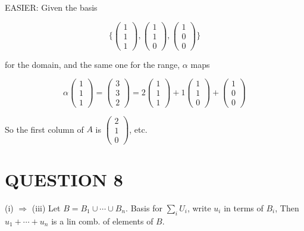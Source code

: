 \documentclass[a4paper]{article}
\begin{document}
EASIER:
Given the basis 

\[ \{  \begin{pmatrix}
1\\
1\\
1
\end{pmatrix},
\begin{pmatrix}
1\\
1\\
0
\end{pmatrix},
\begin{pmatrix}
1\\
0\\
0
\end{pmatrix} \} \]

for the domain, and the same one for the range, $ \alpha $ maps

\[ \alpha \begin{pmatrix}
1\\
1\\
1
\end{pmatrix} = \begin{pmatrix}
3\\
3\\
2
\end{pmatrix} = 2 \begin{pmatrix}
1\\
1\\
1
\end{pmatrix} 
+ 1 \begin{pmatrix}
1\\
1\\
0
\end{pmatrix}
+ 
\begin{pmatrix}
1\\
0\\
0
\end{pmatrix} \]

So the first column of $ A $ is $ \begin{pmatrix}
2\\
1\\
0
\end{pmatrix} $, etc. 



		
\section{QUESTION 8}

(i) $ \Rightarrow $ (iii) Let $ B  = B_{1} \cup \cdots \cup B_{n}$. Basis for $ \sum_{i}  U_{i } $, write $ u_{i} $ in terms of $ B_{i} $, Then $ u_{1} +\cdots +  u_{n} $ is a lin comb. of elements of $ B $.
\end{document}
